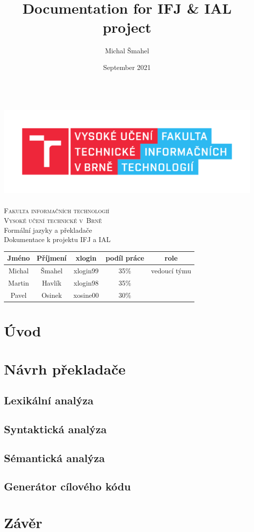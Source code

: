 \documentclass[11pt,a4paper]{article}
\title{Documentation for IFJ \& IAL project}
\author{Michal Šmahel}
\date{September 2021}
\begin{document}
\begin{titlepage}
    \begin{center}
        \includegraphics[height = 160pt]{images/FIT_logo.pdf}\\
		
		{\Huge \textsc{Fakulta informačních technologií}\\[0.4em]}
		{\Huge \textsc{Vysoké učení technické v~Brně}}\\
		{\LARGE Formální jazyky a překladače\\[0.3em]}
		{\LARGE Dokumentace k projektu IFJ a IAL}\\
		
		\begin{tabular}{c c c c c}
            \textbf{Jméno} & \textbf{Příjmení} & \textbf{xlogin} & \textbf{podíl práce} & \textbf{role}\\
            \hline
            Michal & Šmahel & xlogin99 & 35\% & vedoucí týmu \\[5pt]
            Martin & Havlík & xlogin98 & 35\% &\\[5pt]
            Pavel & Osinek & xosine00 & 30\% &  
        \end{tabular}
            
    \end{center}
\end{titlepage}

\newpage
\tableofcontents
\newpage

\section{Úvod}

\section{Návrh překladače}
\subsection{Lexikální analýza}
\subsection{Syntaktická analýza}
\subsection{Sémantická analýza}
\subsection{Generátor cílového kódu}

\section{Závěr}
\end{document}
